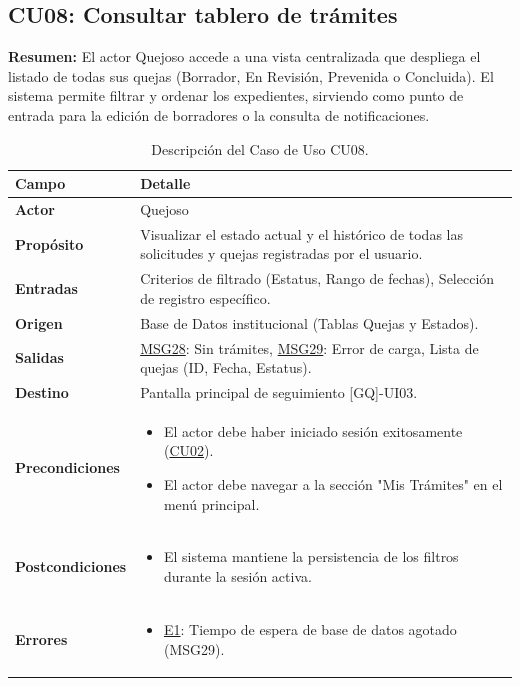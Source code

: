 \begin{appendices}
\subsection{CU08: Consultar tablero de trámites}

\textbf{Resumen:} 
El actor Quejoso accede a una vista centralizada que despliega el listado de todas sus quejas (Borrador, En Revisión, Prevenida o Concluida). El sistema permite filtrar y ordenar los expedientes, sirviendo como punto de entrada para la edición de borradores o la consulta de notificaciones.

\begin{table}[htbp]
\centering
\small
\begin{tabular}{|p{3.5cm}|p{10.5cm}|}
\hline
\rowcolor[HTML]{EFEFEF} 
\textbf{Campo} & \textbf{Detalle} \\ \hline
\textbf{Actor} & Quejoso \\ \hline
\textbf{Propósito} & Visualizar el estado actual y el histórico de todas las solicitudes y quejas registradas por el usuario. \\ \hline
\textbf{Entradas} & Criterios de filtrado (Estatus, Rango de fechas), Selección de registro específico. \\ \hline
\textbf{Origen} & Base de Datos institucional (Tablas Quejas y Estados). \\ \hline
\textbf{Salidas} & \hyperlink{msg:MSG28}{MSG28}: Sin trámites, \hyperlink{msg:MSG29}{MSG29}: Error de carga, Lista de quejas (ID, Fecha, Estatus). \\ \hline
\textbf{Destino} & Pantalla principal de seguimiento [GQ]-UI03. \\ \hline
\textbf{Precondiciones} & 
\begin{itemize}[nosep, leftmargin=*]
    \item El actor debe haber iniciado sesión exitosamente (\hyperlink{anexo:casos_uso}{CU02}).
    \item El actor debe navegar a la sección "Mis Trámites" en el menú principal.
\end{itemize} \\ \hline
\textbf{Postcondiciones} & 
\begin{itemize}[nosep, leftmargin=*]
    \item El sistema mantiene la persistencia de los filtros durante la sesión activa.
\end{itemize} \\ \hline
\textbf{Errores} & 
\begin{itemize}[nosep, leftmargin=*]
    \item \hyperlink{err:E14}{E1}: Tiempo de espera de base de datos agotado (MSG29).
\end{itemize} \\ \hline
\end{tabular}
\caption{Descripción del Caso de Uso CU08.}
\label{tab:cu08_especificacion}
\end{table}


\end{appendices}
